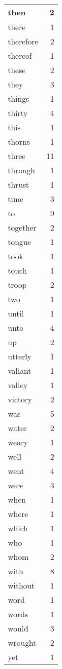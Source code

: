 \begin{center}
\begin{longtable}{l|r}
then & 2 \\ \hline
there & 1 \\ \hline
therefore & 2 \\ \hline
thereof & 1 \\ \hline
these & 2 \\ \hline
they & 3 \\ \hline
things & 1 \\ \hline
thirty & 4 \\ \hline
this & 1 \\ \hline
thorns & 1 \\ \hline
three & 11 \\ \hline
through & 1 \\ \hline
thrust & 1 \\ \hline
time & 3 \\ \hline
to & 9 \\ \hline
together & 2 \\ \hline
tongue & 1 \\ \hline
took & 1 \\ \hline
touch & 1 \\ \hline
troop & 2 \\ \hline
two & 1 \\ \hline
until & 1 \\ \hline
unto & 4 \\ \hline
up & 2 \\ \hline
utterly & 1 \\ \hline
valiant & 1 \\ \hline
valley & 1 \\ \hline
victory & 2 \\ \hline
was & 5 \\ \hline
water & 2 \\ \hline
weary & 1 \\ \hline
well & 2 \\ \hline
went & 4 \\ \hline
were & 3 \\ \hline
when & 1 \\ \hline
where & 1 \\ \hline
which & 1 \\ \hline
who & 1 \\ \hline
whom & 2 \\ \hline
with & 8 \\ \hline
without & 1 \\ \hline
word & 1 \\ \hline
words & 1 \\ \hline
would & 3 \\ \hline
wrought & 2 \\ \hline
yet & 1 \\ \hline
\end{longtable}
\end{center}




